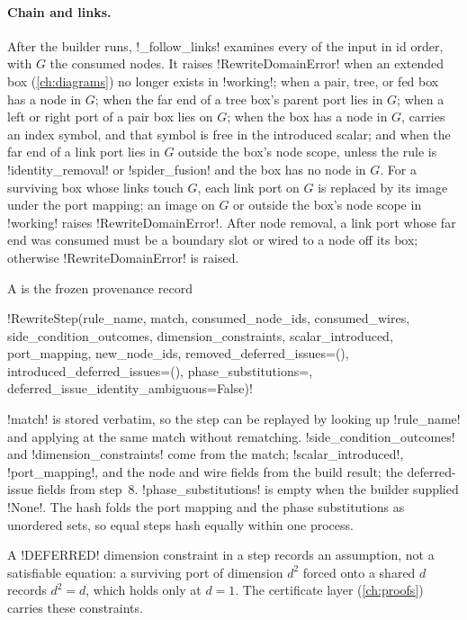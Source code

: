 \paragraph{Chain \bboxes{} and links.}
After the builder runs, \py!_follow_links! examines every \bbox{} of the input in id order, with
$G$ the consumed nodes. It raises \py!RewriteDomainError! when an extended box (\cref{ch:diagrams})
no longer exists in \py!working!; when a pair, tree, or fed box has a node in $G$; when the far end
of a tree box's parent port lies in $G$; when a left or right port of a pair box lies on $G$; when
the box has a node in $G$, carries an index symbol, and that symbol is free in the introduced
scalar; and when the far end of a link port lies in $G$ outside the box's node scope, unless the
rule is \code!identity_removal! or \code!spider_fusion! and the box has no node in $G$. For a
surviving box whose links touch $G$, each link port on $G$ is replaced by its image under the port
mapping; an image on $G$ or outside the box's node scope in \py!working! raises
\py!RewriteDomainError!. After node removal, a link port whose far end was consumed must be a
boundary slot or wired to a node off its box; otherwise \py!RewriteDomainError! is raised.

\begin{definition}\label{def:rewriting-step}
A  is the frozen provenance record
\begin{signature}
\py!RewriteStep(rule_name, match, consumed_node_ids, consumed_wires, side_condition_outcomes, dimension_constraints, scalar_introduced, port_mapping, new_node_ids, removed_deferred_issues=(), introduced_deferred_issues=(), phase_substitutions={}, deferred_issue_identity_ambiguous=False)!
\end{signature}
\py!match! is stored verbatim, so the step can be replayed by looking up \py!rule_name! and
applying at the same match without rematching. \py!side_condition_outcomes! and
\py!dimension_constraints! come from the match; \py!scalar_introduced!, \py!port_mapping!, and the
node and wire fields from the build result; the deferred-issue fields from step~8.
\py!phase_substitutions! is empty when the builder supplied \py!None!. The hash folds the port
mapping and the phase substitutions as unordered sets, so equal steps hash equally within one
process.
\end{definition}

A \code!DEFERRED! dimension constraint in a step records an assumption, not a satisfiable
equation: a surviving port of dimension $d^2$ forced onto a shared $d$ records $d^2 = d$, which
holds only at $d = 1$. The certificate layer (\cref{ch:proofs}) carries these constraints.

